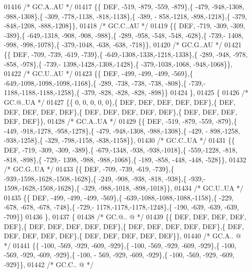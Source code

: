 \begin{DoxyCode}
01416 \textcolor{comment}{/* GC.A..AU */}
01417 \{\{  DEF, -519, -879, -559, -879\},\{ -479, -948,-1308, -988,-1308\},\{ -309, -778,-1138, -818,-1138\},\{ -389, -
      858,-1218, -898,-1218\},\{ -379, -848,-1208, -888,-1208\}\},
01418 \textcolor{comment}{/* GC.C..AU */}
01419 \{\{  DEF, -719, -309, -309, -389\},\{ -649,-1318, -908, -908, -988\},\{ -289, -958, -548, -548, -628\},\{ -739,-
      1408, -998, -998,-1078\},\{ -379,-1048, -638, -638, -718\}\},
01420 \textcolor{comment}{/* GC.G..AU */}
01421 \{\{  DEF, -709, -739, -619, -739\},\{ -649,-1308,-1338,-1218,-1338\},\{ -289, -948, -978, -858, -978\},\{ -739,-
      1398,-1428,-1308,-1428\},\{ -379,-1038,-1068, -948,-1068\}\},
01422 \textcolor{comment}{/* GC.U..AU */}
01423 \{\{  DEF, -499, -499, -499, -569\},\{ -649,-1098,-1098,-1098,-1168\},\{ -289, -738, -738, -738, -808\},\{ -739,-
      1188,-1188,-1188,-1258\},\{ -379, -828, -828, -828, -898\}\}
01424 \},
01425 \{
01426 \textcolor{comment}{/* GC.@..UA */}
01427 \{\{    0,    0,    0,    0,    0\},\{  DEF,  DEF,  DEF,  DEF,  DEF\},\{  DEF,  DEF,  DEF,  DEF,  DEF\},\{  DEF,  
      DEF,  DEF,  DEF,  DEF\},\{  DEF,  DEF,  DEF,  DEF,  DEF\}\},
01428 \textcolor{comment}{/* GC.A..UA */}
01429 \{\{  DEF, -519, -879, -559, -879\},\{ -449, -918,-1278, -958,-1278\},\{ -479, -948,-1308, -988,-1308\},\{ -429, -
      898,-1258, -938,-1258\},\{ -329, -798,-1158, -838,-1158\}\},
01430 \textcolor{comment}{/* GC.C..UA */}
01431 \{\{  DEF, -719, -309, -309, -389\},\{ -679,-1348, -938, -938,-1018\},\{ -559,-1228, -818, -818, -898\},\{ -729,-
      1398, -988, -988,-1068\},\{ -189, -858, -448, -448, -528\}\},
01432 \textcolor{comment}{/* GC.G..UA */}
01433 \{\{  DEF, -709, -739, -619, -739\},\{ -939,-1598,-1628,-1508,-1628\},\{ -249, -908, -938, -818, -938\},\{ -939,-
      1598,-1628,-1508,-1628\},\{ -329, -988,-1018, -898,-1018\}\},
01434 \textcolor{comment}{/* GC.U..UA */}
01435 \{\{  DEF, -499, -499, -499, -569\},\{ -639,-1088,-1088,-1088,-1158\},\{ -229, -678, -678, -678, -748\},\{ -729,-
      1178,-1178,-1178,-1248\},\{ -190, -639, -639, -639, -709\}\}
01436 \},
01437 \{
01438 \textcolor{comment}{/* GC.@.. @ */}
01439 \{\{  DEF,  DEF,  DEF,  DEF,  DEF\},\{  DEF,  DEF,  DEF,  DEF,  DEF\},\{  DEF,  DEF,  DEF,  DEF,  DEF\},\{  DEF,  
      DEF,  DEF,  DEF,  DEF\},\{  DEF,  DEF,  DEF,  DEF,  DEF\}\},
01440 \textcolor{comment}{/* GC.A.. @ */}
01441 \{\{ -100, -569, -929, -609, -929\},\{ -100, -569, -929, -609, -929\},\{ -100, -569, -929, -609, -929\},\{ -100, -
      569, -929, -609, -929\},\{ -100, -569, -929, -609, -929\}\},
01442 \textcolor{comment}{/* GC.C.. @ */}

\end{DoxyCode}

